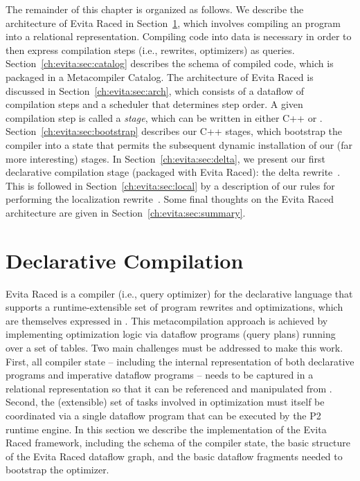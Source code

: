 The remainder of this chapter is organized as follows.  We describe the
architecture of Evita Raced in Section~\ref{ch:evita:sec:compile}, which
involves compiling an \OVERLOG program into a relational representation.
Compiling code into data is necessary in order to then express compilation
steps (i.e., rewrites, optimizers) as queries.
Section~\ref{ch:evita:sec:catalog} describes the schema of compiled code, which
is packaged in a Metacompiler Catalog.  The architecture of Evita Raced is
discussed in Section~\ref{ch:evita:sec:arch}, which consists of a dataflow of
compilation steps and a scheduler that determines step order.  A given
compilation step is called a {\em stage}, which can be written in either C++ or
\OVERLOG.  Section~\ref{ch:evita:sec:bootstrap} describes our C++ stages, which
bootstrap the compiler into a state that permits the subsequent dynamic
installation of our (far more interesting) \OVERLOG stages.  In
Section~\ref{ch:evita:sec:delta}, we present our first declarative compilation
stage (packaged with Evita Raced): the delta rewrite~\cite{loo-sigmod06}.  This
is followed in Section~\ref{ch:evita:sec:local} by a description of our
\OVERLOG rules for performing the localization rewrite~\cite{p2:sosp}.  Some
final thoughts on the Evita Raced architecture are given in
Section~\ref{ch:evita:sec:summary}.

\section{Declarative Compilation}
\label{ch:evita:sec:compile}

Evita Raced is a compiler (i.e., query optimizer) for the \OVERLOG
declarative language that supports a runtime-extensible set of program
rewrites and optimizations, which are themselves expressed in \OVERLOG.
This metacompilation approach is achieved by implementing optimization
logic via dataflow programs  (query plans) running over a set of tables.  Two
main challenges must be addressed to make this work.  First, all
compiler state -- including the internal representation of both
declarative \OVERLOG programs and imperative dataflow programs -- needs
to be captured in a relational representation so that it can be
referenced and manipulated from \OVERLOG.  Second, the (extensible) set
of tasks involved in optimization must itself be coordinated via a
single dataflow program that can be executed by the P2 runtime engine.
In this section we describe the implementation of the Evita Raced
framework, including the schema of the compiler state, the basic
structure of the Evita Raced dataflow graph, and the basic dataflow
fragments needed to bootstrap the optimizer.

